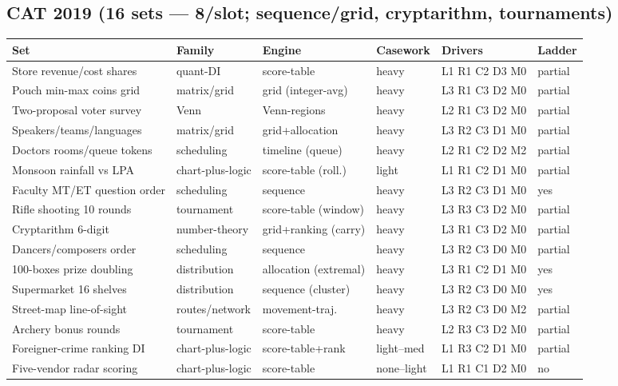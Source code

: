 \documentclass[11pt,a4paper]{article}
\newcommand{\invtab}{\footnotesize}
\begin{document}
\subsection{CAT 2019 (16 sets --- 8/slot; sequence/grid, cryptarithm, tournaments)}
{\invtab
\begin{longtable}{p{3.0cm}p{2.05cm}p{2.5cm}p{1.2cm}p{2.05cm}p{1.7cm}}
\toprule
\textbf{Set} & \textbf{Family} & \textbf{Engine} & \textbf{Casework} & \textbf{Drivers} & \textbf{Ladder} \\
\midrule
\endhead
Store revenue/cost shares & quant-DI & score-table & heavy & L1 R1 C2 D3 M0 & partial \\
Pouch min-max coins grid & matrix/grid & grid (integer-avg) & heavy & L3 R1 C3 D2 M0 & partial \\
Two-proposal voter survey & Venn & Venn-regions & heavy & L2 R1 C3 D2 M0 & partial \\
Speakers/teams/languages & matrix/grid & grid+allocation & heavy & L3 R2 C3 D1 M0 & partial \\
Doctors rooms/queue tokens & scheduling & timeline (queue) & heavy & L2 R1 C2 D2 M2 & partial \\
Monsoon rainfall vs LPA & chart-plus-logic & score-table (roll.) & light & L1 R1 C2 D1 M0 & partial \\
Faculty MT/ET question order & scheduling & sequence & heavy & L3 R2 C3 D1 M0 & yes \\
Rifle shooting 10 rounds & tournament & score-table (window) & heavy & L3 R3 C3 D2 M0 & partial \\
Cryptarithm 6-digit & number-theory & grid+ranking (carry) & heavy & L3 R1 C3 D2 M0 & partial \\
Dancers/composers order & scheduling & sequence & heavy & L3 R2 C3 D0 M0 & partial \\
100-boxes prize doubling & distribution & allocation (extremal) & heavy & L3 R1 C2 D1 M0 & yes \\
Supermarket 16 shelves & distribution & sequence (cluster) & heavy & L3 R2 C3 D0 M0 & yes \\
Street-map line-of-sight & routes/network & movement-traj. & heavy & L3 R2 C3 D0 M2 & partial \\
Archery bonus rounds & tournament & score-table & heavy & L2 R3 C3 D2 M0 & partial \\
Foreigner-crime ranking DI & chart-plus-logic & score-table+rank & light--med & L1 R3 C2 D1 M0 & partial \\
Five-vendor radar scoring & chart-plus-logic & score-table & none--light & L1 R1 C1 D2 M0 & no \\
\bottomrule
\end{longtable}}
\end{document}
